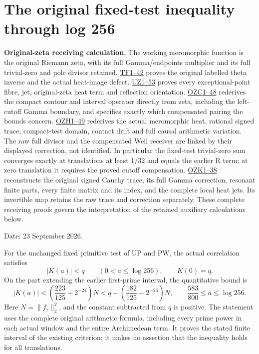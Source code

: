 \documentclass[
  10pt,
  a4paper,
]{article}
\author{}
\date{}
\begin{document}
{
\setcounter{tocdepth}{3}
\tableofcontents
}
\section{The original fixed-test inequality through log
256}\label{the-original-fixed-test-inequality-through-log-256}

\textbf{Original-zeta receiving calculation.} The working meromorphic
function is the original Riemann zeta, with its full Gamma/endpoints
multiplier and its full trivial-zero and pole divisor retained.
\href{FAITHFUL_THETA_COMPLETION_RETURN.md}{TF1--42} proves the original
labelled theta inverse and the actual heat-image defect.
\href{FAITHFUL_UNCOMPLETED_ZETA_HEAT.md}{UZ1--53} proves every
exceptional-point fibre, jet, original-zeta heat term and reflection
orientation.
\href{ORIGINAL_ZETA_COMPACT_WEIL_RECONSTRUCTION.md}{OZC1--48} rederives
the compact contour and interval operator directly from zeta, including
the left-cutoff Gamma boundary, and specifies exactly which compensated
pairing the bounds concern.
\href{ORIGINAL_ZETA_HEAT_CONTACT_RECONSTRUCTION.md}{OZH1--49} rederives
the actual meromorphic heat, rational signed trace, compact-test domain,
contact drift and full causal arithmetic variation. The raw full divisor
and the compensated Weil receiver are linked by their displayed
correction, not identified. In particular the fixed-test trivial-zero
sum converges exactly at translations at least 1/32 and equals the
earlier R term; at zero translation it requires the proved cutoff
compensation. \href{ORIGINAL_ZETA_CAUCHY_RECONSTRUCTION.md}{OZK1--38}
reconstructs the original signed Cauchy trace, its full Gamma
correction, resonant finite parts, every finite matrix and its index,
and the complete local heat jets. Its invertible map retains the raw
trace and correction separately. These complete receiving proofs govern
the interpretation of the retained auxiliary calculations below.

Date: 23 September 2026.

For the unchanged fixed primitive test of UP and PW, the actual
correlation satisfies \[
 |K(a)|<q\qquad(0<a\le\log256),\qquad K(0)=q.
 \tag{FP1}
\] On the part extending the earlier first-prime interval, the
quantitative bound is \[
 \boxed{\displaystyle
 |K(a)|<
 \left(\frac{223}{125}+2^{-24}\right)N
 <q-\left(\frac{182}{125}-2^{-24}\right)N,
 \qquad \frac{583}{800}\le a\le\log256.}
 \tag{FP2}
\] Here \(N=\|f_r\|_2^2\), and the constant subtracted from \(q\) is
positive. The statement uses the complete original arithmetic formula,
including every prime power in each actual window and the entire
Archimedean term. It proves the stated finite interval of the existing
criterion; it makes no assertion that the inequality holds for all
translations.
\end{document}
